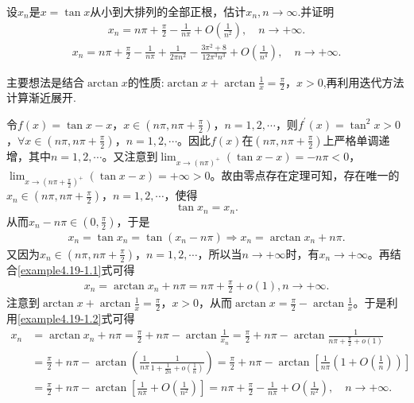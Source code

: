 \documentclass[../../main.tex]{subfiles}%
\begin{document}
\begin{example}
设\(x_n\)是\(x = \tan x\)从小到大排列的全部正根，估计$x_n,n\to \infty$.并证明
\begin{align*}
x_n = n\pi +\frac{\pi}{2}-\frac{1}{n\pi}+O(\frac{1}{n^2}),\quad n\rightarrow +\infty .
\end{align*}
\begin{align*}
x_n=n\pi +\frac{\pi}{2}-\frac{1}{n\pi}+\frac{1}{2\pi n^2}-\frac{3\pi ^2+8}{12\pi ^3n^3}+O\left( \frac{1}{n^4} \right) ,\quad n\rightarrow +\infty .
\end{align*}
\end{example}
\begin{note}
主要想法是结合$\arctan x$的性质:\(\arctan x + \arctan\frac{1}{x} = \frac{\pi}{2}\)，\(x > 0\),再利用迭代方法计算渐近展开.
\end{note}
\begin{solution}

令\(f(x)=\tan x - x\)，\(x\in(n\pi, n\pi + \frac{\pi}{2})\)，\(n = 1, 2, \cdots\)，则\(f^\prime(x)=\tan^2 x > 0\)，\(\forall x\in(n\pi, n\pi + \frac{\pi}{2})\)，\(n = 1, 2, \cdots\)。因此\(f(x)\)在\((n\pi, n\pi + \frac{\pi}{2})\)上严格单调递增，其中\(n = 1, 2, \cdots\)。又注意到\(\lim_{x\rightarrow (n\pi)^+}(\tan x - x)= -n\pi < 0\)，\(\lim_{x\rightarrow (n\pi + \frac{\pi}{2})^+}(\tan x - x)= +\infty > 0\)。故由零点存在定理可知，存在唯一的\(x_n\in(n\pi, n\pi + \frac{\pi}{2})\)，\(n = 1, 2, \cdots\)，使得
\[
\tan x_n = x_n.
\]
从而\(x_n - n\pi\in(0, \frac{\pi}{2})\)，于是
\begin{align}\label{example4.19-1.1}
x_n = \tan x_n = \tan(x_n - n\pi) \Longrightarrow x_n = \arctan x_n + n\pi.  
\end{align}
又因为\(x_n\in(n\pi, n\pi + \frac{\pi}{2})\)，\(n = 1, 2, \cdots\)，所以当\(n\rightarrow +\infty\)时，有\(x_n\rightarrow +\infty\)。再结合\eqref{example4.19-1.1}式可得
\begin{align}\label{example4.19-1.2}
x_n = \arctan x_n + n\pi = n\pi + \frac{\pi}{2} + o(1), n\rightarrow +\infty.
\end{align}
注意到\(\arctan x + \arctan\frac{1}{x} = \frac{\pi}{2}\)，\(x > 0\)，从而\(\arctan x = \frac{\pi}{2} - \arctan\frac{1}{x}\)。于是利用\eqref{example4.19-1.2}式可得
\begin{align}
x_n&=\arctan x_n+n\pi =\frac{\pi}{2}+n\pi -\arctan \frac{1}{x_n}=\frac{\pi}{2}+n\pi -\arctan \frac{1}{n\pi +\frac{\pi}{2}+o(1)}\nonumber
\\
&=\frac{\pi}{2}+n\pi -\arctan \left( \frac{1}{n\pi}\frac{1}{1+\frac{1}{2n}+o(\frac{1}{n})} \right) =\frac{\pi}{2}+n\pi -\arctan \left[ \frac{1}{n\pi}\left( 1+O(\frac{1}{n}) \right) \right] \nonumber
\\
&=\frac{\pi}{2}+n\pi -\arctan \left[ \frac{1}{n\pi}+O(\frac{1}{n^2}) \right] = n\pi +\frac{\pi}{2}-\frac{1}{n\pi}+O(\frac{1}{n^2}),\quad n\rightarrow +\infty .\label{eq::::HIOIOWIOJDJIOWHJFHUQPPPP}
\end{align}


\end{solution}
\end{document}
